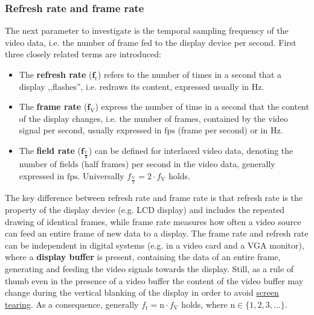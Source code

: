 
\subsubsection*{Refresh rate and frame rate}

The next parameter to investigate is the temporal sampling frequency of the video data, i.e. the number of frame fed to the display device per second.
First three closely related terms are introduced:
\begin{itemize}
\item The \textbf{refresh rate} ($\mathbf{f_{\mathrm{r}}}$) refers to the number of times in a second that a display ,,flashes'', i.e. redraws its content, expressed usually in $\mathrm{Hz}$.
\item The \textbf{frame rate} ($\mathbf{f_{\mathrm{V}}}$) express the number of time in a second that the content of the display changes, i.e. the number of frames, contained by the video signal per second, usually expressed in $\mathrm{fps}$ (frame per second) or in $\mathrm{Hz}$.
\item The \textbf{field rate} ($\mathbf{f_{\frac{\mathrm{V}}{2}}}$) can be defined for interlaced video data, denoting the number of fields (half frames) per second in the video data, generally expressed in $\mathrm{fps}$.
Universally $f_{\frac{\mathrm{V}}{2}} = 2\cdot f_{\mathrm{V}}$ holds.
\end{itemize}
The key difference between refresh rate and frame rate is that refresh rate is the property of the display device (e.g. LCD display) and includes the repeated drawing of identical frames, while frame rate measures how often a video source can feed an entire frame of new data to a display.
The frame rate and refresh rate can be independent in digital systems (e.g. in a video card and a VGA monitor), where a \textbf{display buffer} is present, containing the data of an entire frame, generating and feeding the video signals towards the display.
Still, as a rule of thumb even in the presence of a video buffer the content of the video buffer may change during the vertical blanking of the display in order to avoid \href{https://en.wikipedia.org/wiki/Screen_tearing#/media/File:Tearing_(simulated).jpg}{screen tearing}.
As a consequence, generally $f_{\mathrm{r}} = \mathrm{n} \cdot f_{\mathrm{V}}$ holds, where $\mathrm{n} \in \lbrace 1,2,3,... \rbrace$.

